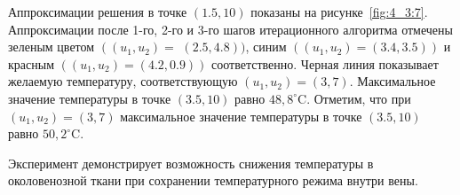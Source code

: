Аппроксимации решения в точке $(1.5,10)$ показаны на рисунке~\ref{fig:4_3:7}.
Аппроксимации после 1-го, 2-го и 3-го шагов итерационного
алгоритма отмечены зеленым цветом
$\left(\left(u_{1 }, u_{2}\right)=\right.$ $(2.5,4.8))$,
синим  $\left(\left(u_{1}, u_{2}\right)=(3.4,3.5)\right)$
и красным $\left(\left(u_{1}, u_{2}\right)=(4.2,0.9)\right)$ соответственно.
Черная линия показывает желаемую температуру, соответствующую
$\left(u_{1}, u_{2}\right)=(3,7)$.
Максимальное значение температуры в точке $(3.5,10)$ равно $48,8^{\circ}\mathrm{C}$.
Отметим, что при $\left(u_{1}, u_{2}\right)=(3,7)$ максимальное значение
температуры в точке $(3.5,10)$ равно $50,2^{ \circ} \mathrm{C}$.

Эксперимент демонстрирует возможность снижения температуры в
околовенозной ткани при сохранении температурного режима внутри вены.
